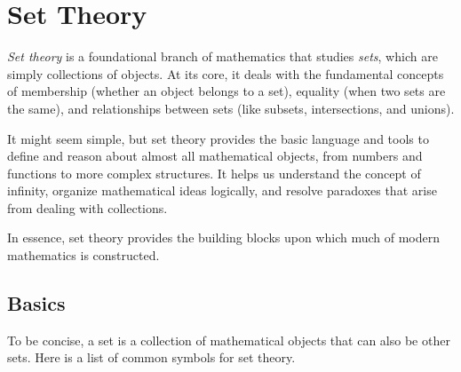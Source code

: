 \newpage
\section{Set Theory}

\emph{Set theory} is a foundational branch of mathematics that studies \emph{sets}, which are simply 
collections of objects. At its core, it deals with the fundamental concepts of membership 
(whether an object belongs to a set), equality (when two sets are the same), and relationships 
between sets (like subsets, intersections, and unions).

It might seem simple, but set theory provides the basic language and tools to define 
and reason about almost all mathematical objects, from numbers and functions to 
more complex structures. It helps us understand the concept of infinity, organize mathematical 
ideas logically, and resolve paradoxes that arise from dealing with collections.

In essence, set theory provides the building blocks upon which much of modern mathematics is constructed.

\subsection{Basics}

To be concise, a set is a collection of mathematical objects that can also be other sets.
Here is a list of common symbols for set theory.

